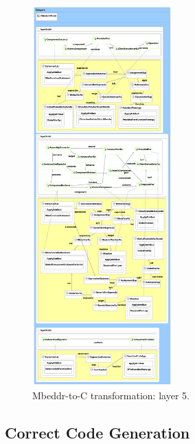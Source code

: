 \begin{figure}
\begin{center}
  \includegraphics[width=0.48\textwidth]{figures/mbeddr2C_optimized_layer_5}
  \caption{Mbeddr-to-C transformation: layer 5.}
  \label{fig:mb2c_layer_5}
\end{center}
\end{figure}


\subsection{Correct Code Generation}


